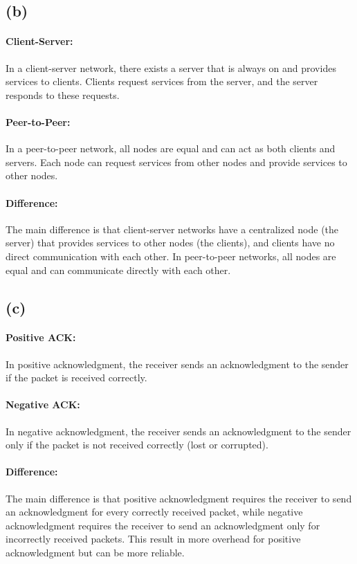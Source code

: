 \documentclass[a4paper,12pt]{article}
\begin{document}
\subsection*{(b)}

\paragraph{Client-Server:} In a client-server network, there exists a server that is always on and provides services to clients. Clients request services from the server, and the server responds to these requests.

\paragraph{Peer-to-Peer:} In a peer-to-peer network, all nodes are equal and can act as both clients and servers. Each node can request services from other nodes and provide services to other nodes.

\paragraph{Difference:} The main difference is that client-server networks have a centralized node (the server) that provides services to other nodes (the clients), and clients have no direct communication with each other. In peer-to-peer networks, all nodes are equal and can communicate directly with each other.

\subsection*{(c)}

\paragraph{Positive ACK:} In positive acknowledgment, the receiver sends an acknowledgment to the sender if the packet is received correctly.

\paragraph{Negative ACK:} In negative acknowledgment, the receiver sends an acknowledgment to the sender only if the packet is not received correctly (lost or corrupted).

\paragraph{Difference:} The main difference is that positive acknowledgment requires the receiver to send an acknowledgment for every correctly received packet, while negative acknowledgment requires the receiver to send an acknowledgment only for incorrectly received packets. This result in more overhead for positive acknowledgment but can be more reliable.
\end{document}
